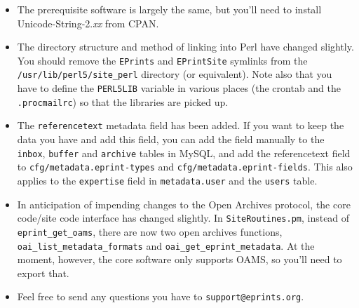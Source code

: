 \documentclass[a4paper]{article}
\begin{document}
\begin{itemize}
\item The prerequisite software is largely the same, but you'll need to install Unicode-String-2.\emph{xx} from CPAN.
\item The directory structure and method of linking into Perl have changed slightly. You should remove the {\tt EPrints} and {\tt EPrintSite} symlinks from the {\tt /usr/lib/perl5/site\_perl} directory (or equivalent). Note also that you have to define the {\tt PERL5LIB} variable in various places (the crontab and the {\tt .procmailrc}) so that the libraries are picked up.
\item The {\tt referencetext} metadata field has been added. If you want to keep the data you have and add this field, you can add the field manually to the {\tt inbox}, {\tt buffer} and {\tt archive} tables in MySQL, and add the referencetext field to {\tt cfg/metadata.eprint-types} and {\tt cfg/metadata.eprint-fields}. This also applies to the {\tt expertise} field in {\tt metadata.user} and the {\tt users} table.
\item In anticipation of impending changes to the Open Archives protocol, the core code/site code interface has changed slightly. In {\tt SiteRoutines.pm}, instead of {\tt eprint\_get\_oams}, there are now two open archives functions, {\tt oai\_list\_metadata\_formats} and {\tt oai\_get\_eprint\_metadata}. At the moment, however, the core software only supports OAMS, so you'll need to export that.
\item Feel free to send any questions you have to {\tt support@eprints.org}.
\end{itemize}




\end{document}
